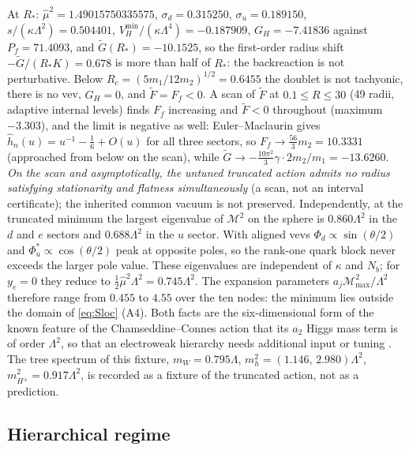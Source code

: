 \documentclass[11pt,letterpaper]{article}
\newcommand{\Mb}{\mathcal M}
\newcommand{\Lam}{\Lambda}
\newcommand{\hmu}{\hat\mu}
\begin{document}
At $R_*$: $\hmu^2=1.49015750335575$, $\sigma_d=0.315250$, $\sigma_u=0.189150$, $s/(\kappa\Lam^2)=0.504401$, $V_H^{\min}/(\kappa\Lam^4)=-0.187909$, $G_H=-7.41836$ against $P_f=71.4093$, and $\tilde G(R_*)=-10.1525$, so the first-order radius shift $-\tilde G/(R_*K)=0.678$ is more than half of $R_*$: the backreaction is not perturbative. Below $R_c=(5m_1/12m_2)^{1/2}=0.6455$ the doublet is not tachyonic, there is no vev, $G_H=0$, and $\tilde F=F_f<0$. A scan of $\tilde F$ at $0.1\le R\le30$ (49 radii, adaptive internal levels) finds $F_f$ increasing and $\tilde F<0$ throughout (maximum $-3.303$), and the limit is negative as well: Euler--Maclaurin gives $\hat h_n(u)=u^{-1}-\tfrac16+O(u)$ for all three sectors, so $F_f\to\tfrac{56}3m_2=10.3331$ (approached from below on the scan), while $\tilde G\to-\tfrac{10\pi^2}3\gamma\cdot2m_2/m_1=-13.6260$. \emph{On the scan and asymptotically, the untuned truncated action admits no radius satisfying stationarity and flatness simultaneously} (a scan, not an interval certificate); the inherited common vacuum is not preserved. Independently, at the truncated minimum the largest eigenvalue of $\Mb^2$ on the sphere is $0.860\Lam^2$ in the $d$ and $e$ sectors and $0.688\Lam^2$ in the $u$ sector. With aligned vevs $\Phi_d\propto\sin(\theta/2)$ and $\Phi_u^{*}\propto\cos(\theta/2)$ peak at opposite poles, so the rank-one quark block never exceeds the larger pole value. These eigenvalues are independent of $\kappa$ and $N_b$; for $y_e=0$ they reduce to $\tfrac12\hmu^2\Lam^2=0.745\Lam^2$. The expansion parameters $a_j\Mb^2_{\max}/\Lam^2$ therefore range from $0.455$ to $4.55$ over the ten nodes: the minimum lies outside the domain of \eqref{eq:Sloc} (A4). Both facts are the six-dimensional form of the known feature of the Chamseddine--Connes action that its $a_2$ Higgs mass term is of order $\Lam^2$, so that an electroweak hierarchy needs additional input or tuning \cite{CCM}. The tree spectrum of this fixture, $m_W=0.795\Lam$, $m_{h}^2=(1.146,\,2.980)\Lam^2$, $m_{H^\pm}^2=0.917\Lam^2$, is recorded as a fixture of the truncated action, not as a prediction.

\subsection{Hierarchical regime}
\end{document}
